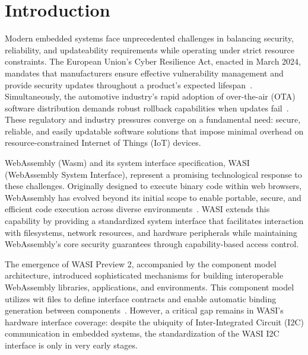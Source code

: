 \chapter{Introduction}
\label{chap:introduction}

Modern embedded systems face unprecedented challenges in balancing security, reliability, and updateability requirements while operating under strict resource constraints. The European Union's Cyber Resilience Act, enacted in March 2024, mandates that manufacturers ensure effective vulnerability management and provide security updates throughout a product's expected lifespan~\cite{eu_cyber_res_act}. Simultaneously, the automotive industry's rapid adoption of over-the-air (OTA) software distribution demands robust rollback capabilities when updates fail~\cite{automotive_ota}. These regulatory and industry pressures converge on a fundamental need: secure, reliable, and easily updatable software solutions that impose minimal overhead on resource-constrained Internet of Things (IoT) devices.

WebAssembly (Wasm) and its system interface specification, WASI (WebAssembly System Interface), represent a promising technological response to these challenges. Originally designed to execute binary code within web browsers, WebAssembly has evolved beyond its initial scope to enable portable, secure, and efficient code execution across diverse environments~\cite{wasm_spec}. WASI extends this capability by providing a standardized system interface that facilitates interaction with filesystems, network resources, and hardware peripherals while maintaining WebAssembly's core security guarantees through capability-based access control.


The emergence of WASI Preview 2, accompanied by the component model architecture, introduced sophisticated mechanisms for building interoperable WebAssembly libraries, applications, and environments. This component model utilizes \acrfull{wit} files to define interface contracts and enable automatic binding generation between components~\cite{wasi_p2}. However, a critical gap remains in WASI's hardware interface coverage: despite the ubiquity of Inter-Integrated Circuit (I2C) communication in embedded systems, the standardization of the WASI I2C interface is only in very early stages.

